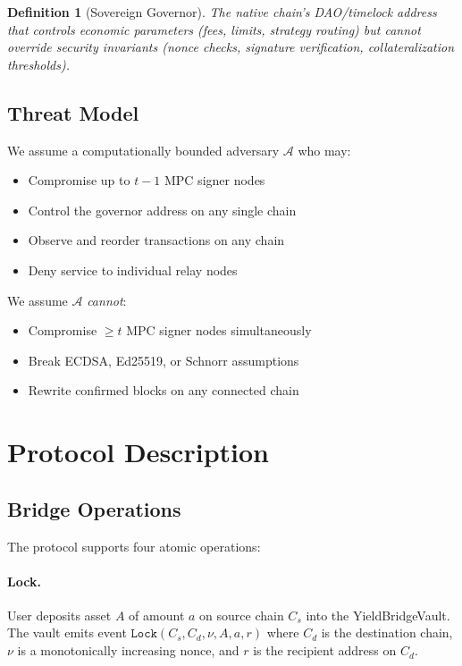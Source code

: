 \documentclass[11pt,twocolumn]{article}
\newtheorem{definition}[theorem]{Definition}
\begin{document}
\begin{definition}[Sovereign Governor]
The native chain's DAO/timelock address that controls economic parameters (fees, limits, strategy routing) but \emph{cannot} override security invariants (nonce checks, signature verification, collateralization thresholds).
\end{definition}

\subsection{Threat Model}

We assume a computationally bounded adversary $\mathcal{A}$ who may:
\begin{itemize}[nosep]
  \item Compromise up to $t - 1$ MPC signer nodes
  \item Control the governor address on any single chain
  \item Observe and reorder transactions on any chain
  \item Deny service to individual relay nodes
\end{itemize}

We assume $\mathcal{A}$ \emph{cannot}:
\begin{itemize}[nosep]
  \item Compromise $\geq t$ MPC signer nodes simultaneously
  \item Break ECDSA, Ed25519, or Schnorr assumptions
  \item Rewrite confirmed blocks on any connected chain
\end{itemize}

\section{Protocol Description}

\subsection{Bridge Operations}

The protocol supports four atomic operations:

\paragraph{Lock.} User deposits asset $A$ of amount $a$ on source chain $C_s$ into the YieldBridgeVault. The vault emits event $\texttt{Lock}(C_s, C_d, \nu, A, a, r)$ where $C_d$ is the destination chain, $\nu$ is a monotonically increasing nonce, and $r$ is the recipient address on $C_d$.
\end{document}
